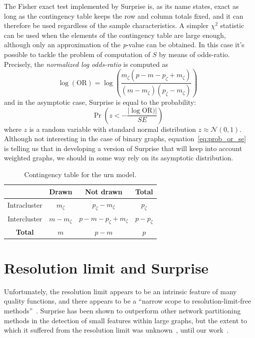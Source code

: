 The Fisher exact test implemented by Surprise is, as its name states, exact as long as the contingency table keeps the row and column totals fixed, and it can therefore be used regardless of the sample characteristics. A simpler $\chi^2$ statistic can be used when the elements of the contingency table are large enough, although only an approximation of the \emph{p}-value can be obtained.
In this case it's possible to tackle the problem of computation of $S$ by means of odds-ratio. Precisely, the \emph{normalized log odds-ratio} is computed as 
\begin{equation}
\log(\textrm{OR}) = \log\left( \frac{m_\zeta(p-m-p_\zeta+m_\zeta)}{(m-m_\zeta)(p_\zeta-m_\zeta)} \right )
\end{equation}
and in the asymptotic case, Surprise is equal to the probability:
\begin{equation}\label{eq:prob_or_se}
\Pr\left(z < -\frac{|\log\textrm{OR})|}{SE} \right)
\end{equation}
where $z$ is a random variable with standard normal distribution $z \approx \mathcal{N}(0,1)$.
Although not interesting in the case of binary graphs, equation~\ref{eq:prob_or_se} is telling us that in developing a version of Surprise that will keep into account weighted graphs, we should in some way rely on its asymptotic distribution.

\begin{table}[htb!]
\centering
\begin{tabular}{|c|c|c|c|}
\hline
 & Drawn & Not drawn & \textbf{Total}\\
\hline
Intracluster & $m_\zeta$ & $p_\zeta-m_\zeta$ & $p_\zeta$\\
\hline
Intercluster & $m-m_\zeta$ & $p-m-p_\zeta+m_\zeta$ & $p-p_\zeta$ \\
\hline
\textbf{Total} & $m$ & $p-m$ & $p$ \\
\hline
\end{tabular}
\caption{Contingency table for the urn model.}
\label{tab:contingency_table}
\end{table}

\section{Resolution limit and Surprise}
Unfortunately, the resolution limit appears to be an intrinsic feature of many quality functions, and there appears to be a ``narrow scope to resolution-limit-free methods''~\cite{traag2015}.  
Surprise has been shown to outperform other network partitioning methods in the detection of small features within large graphs, but the extent to which it suffered from the resolution limit was unknown~\cite{aldecoa2011,aldecoa2013}, until our work~\cite{nicolini2016}.


